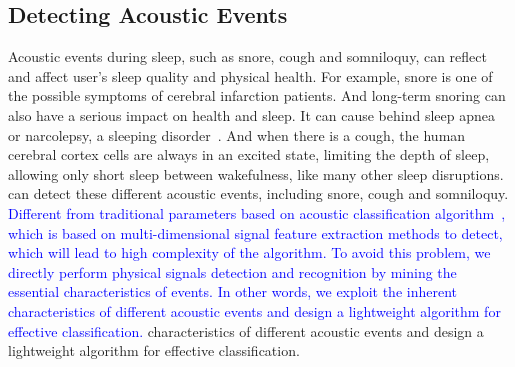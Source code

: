 \subsection{Detecting Acoustic Events \label{sec:acoustic}}
Acoustic events during sleep, such as snore, cough and somniloquy, can reflect and affect user's sleep quality and physical health. For example, snore is one of the possible symptoms of cerebral infarction patients.  And long-term snoring can also have a serious impact on health and sleep. It can cause behind sleep apnea or narcolepsy, a sleeping disorder~\cite{snoring2016,snoring2013}. And when there is a cough, the human cerebral cortex cells are always in an excited state, limiting the depth of sleep, allowing only short sleep between wakefulness, like many other sleep disruptions. {\systemname} can detect these different acoustic events, including snore, cough and somniloquy.
\textcolor{blue}{Different from traditional parameters based on acoustic classification algorithm~\cite{gu2016sleep}, which is based on
multi-dimensional signal feature extraction methods to detect, which will lead to high complexity of the algorithm. To avoid this problem,
we directly perform physical signals detection and recognition by mining the essential characteristics of events. In other words, we
exploit the inherent characteristics of different acoustic events and design a lightweight algorithm for effective
classification.}%
characteristics of different acoustic events and design a lightweight algorithm for effective classification.

